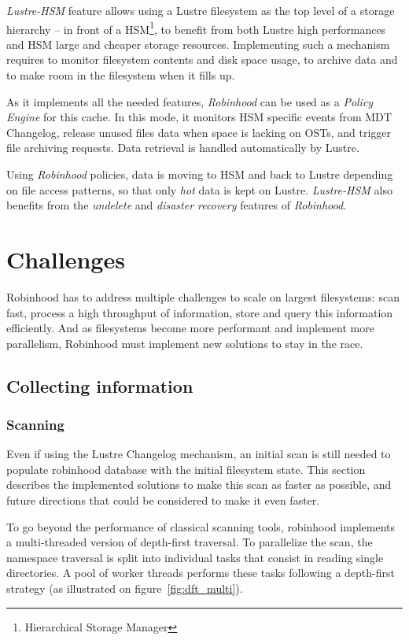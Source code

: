 \documentclass[conference]{IEEEtran}
\begin{document}
\emph{Lustre-HSM} feature allows using a Lustre filesystem as the top level of a storage hierarchy -- in front of a HSM\footnote{Hierarchical Storage Manager}, to benefit from both Lustre high performances and HSM large and cheaper storage resources.
Implementing such a mechanism requires to monitor filesystem contents
and disk space usage, to archive data and to make room in the filesystem when it fills up.

As it implements all the needed features, \emph{Robinhood} can be used as a \emph{Policy Engine} for this cache. In this mode, it monitors HSM specific events from MDT Changelog, release unused files data when space is lacking on OSTs, and trigger file archiving requests. Data retrieval is handled automatically by Lustre.

Using \emph{Robinhood} policies, data is moving to HSM and back to Lustre
depending on file access patterns, so that only {\it hot} data is kept on Lustre.
\emph{Lustre-HSM} also benefits from the {\it undelete} and {\it disaster recovery} features of \emph{Robinhood}.

\section{Challenges}
Robinhood has to address multiple challenges to scale on largest filesystems: scan fast,
process a high throughput of information, store and query this information efficiently.
And as filesystems become more performant and implement more parallelism,
Robinhood must implement new solutions to stay in the race.

\subsection{Collecting information}
\subsubsection{Scanning}

Even if using the Lustre Changelog me\-cha\-nism, an initial scan is still needed to populate robinhood database with the initial filesystem state. This section describes the implemented solutions to make this scan as faster as possible, and future directions that could be considered to make it even faster.

To go beyond the performance of classical scanning tools, robinhood implements a multi-threaded version of depth-first traversal\cite{Knuth}. To parallelize the scan, the namespace traversal is split into individual tasks that consist in
reading single directories. A pool of worker threads performs these tasks following a depth-first strategy (as illustrated on figure~\ref{fig:dft_multi}).
\end{document}

